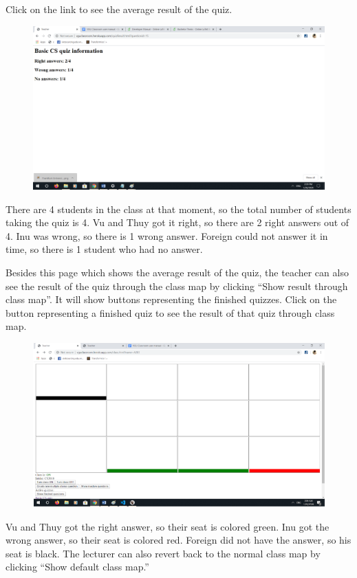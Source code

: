 \documentclass[a4paper, 11pt,openany]{book} %
\begin{document}
Click on the link to see the average result of the quiz.
\begin{figure}[H]
    \centering
    \includegraphics[width=\textwidth,height=\textheight,keepaspectratio]{images/21.png}
\end{figure}
There are 4 students in the class at that moment, so the total number of students taking the quiz is 4. Vu and Thuy got it right, so there are 2 right answers out of 4. Inu was wrong, so there is 1 wrong answer. Foreign could not answer it in time, so there is 1 student who had no answer.\par 
Besides this page which shows the average result of the quiz, the teacher can also see the result of the quiz through the class map by clicking “Show result through class map”. It will show buttons representing the finished quizzes.
Click on the button representing a finished quiz to see the result of that quiz through class map.
\begin{figure}[H]
    \centering
    \includegraphics[width=\textwidth,height=\textheight,keepaspectratio]{images/22.png}
\end{figure}
Vu and Thuy got the right answer, so their seat is colored green. Inu got the wrong answer, so their seat is colored red. Foreign did not have the answer, so his seat is black. The lecturer can also revert back to the normal class map by clicking “Show default class map.”
\end{document}
